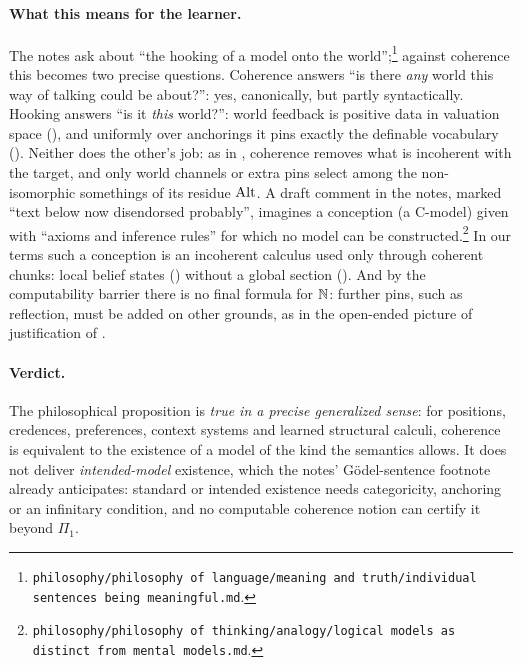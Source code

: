 \paragraph{What this means for the learner.} The notes ask about ``the hooking of a model onto the world'';\footnote{\texttt{philosophy/philosophy of language/meaning and truth/individual sentences being meaningful.md}.} against coherence this becomes two precise questions. Coherence answers ``is there \emph{any} world this way of talking could be about?'': yes, canonically, but partly syntactically. Hooking answers ``is it \emph{this} world?'': world feedback is positive data in valuation space (), and uniformly over anchorings it pins exactly the definable vocabulary (). Neither does the other's job: as in , coherence removes what is incoherent with the target, and only world channels or extra pins select among the non-isomorphic somethings of its residue $\mathrm{Alt}$. A draft comment in the notes, marked ``text below now disendorsed probably'', imagines a conception (a C-model) given with ``axioms and inference rules'' for which no model can be constructed.\footnote{\texttt{philosophy/philosophy of thinking/analogy/logical models as distinct from mental models.md}.} In our terms such a conception is an incoherent calculus used only through coherent chunks: local belief states () without a global section (). And by the computability barrier there is no final formula for $\mathbb{N}$: further pins, such as reflection, must be added on other grounds, as in the open-ended picture of justification of .

\paragraph{Verdict.} The philosophical proposition is \emph{true in a precise generalized sense}: for positions, credences, preferences, context systems and learned structural calculi, coherence is equivalent to the existence of a model of the kind the semantics allows. It does not deliver \emph{intended-model} existence, which the notes' G\"odel-sentence footnote already anticipates: standard or intended existence needs categoricity, anchoring or an infinitary condition, and no computable coherence notion can certify it beyond $\Pi_1$.
